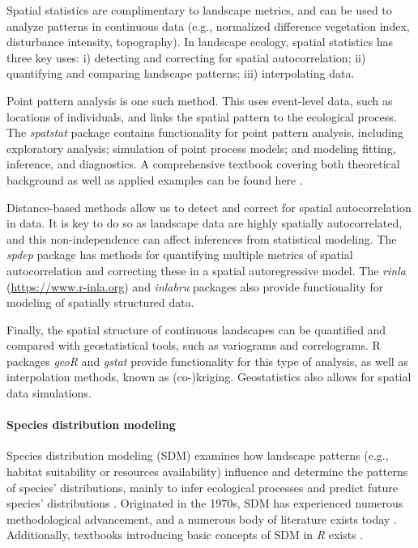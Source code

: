 \documentclass[smallextended]{svjour3}       %
\begin{document}
Spatial statistics are complimentary to landscape metrics, and can be used to analyze patterns in continuous data (e.g., normalized difference vegetation index, disturbance intensity, topography).
In landscape ecology, spatial statistics has three key uses: i) detecting and correcting for spatial autocorrelation; ii) quantifying and comparing landscape patterns; iii) interpolating data.

Point pattern analysis is one such method.
This uses event-level data, such as locations of individuals, and links the spatial pattern to the ecological process.
The \emph{spatstat} package \cite{R-spatstat} contains functionality for point pattern analysis, including exploratory analysis; simulation of point process models; and modeling fitting, inference, and diagnostics.
A comprehensive textbook covering both theoretical background as well as applied examples can be found here \cite{Baddeley2015}.

Distance-based methods allow us to detect and correct for spatial autocorrelation in data.
It is key to do so as landscape data are highly spatially autocorrelated, and this non-independence can affect inferences from statistical modeling.
The \emph{spdep} package \cite{Bivand2013} has methods for quantifying multiple metrics of spatial autocorrelation and correcting these in a spatial autoregressive model.
The \emph{rinla} \cite{rue2009approximate} (\url{https://www.r-inla.org}) and \emph{inlabru} \cite{R-inlabru} packages also provide functionality for modeling of spatially structured data.

Finally, the spatial structure of continuous landscapes can be quantified and compared with geostatistical tools, such as variograms and correlograms.
R packages \emph{geoR} \cite{R-geoR} and \emph{gstat} \cite{R-gstat} provide functionality for this type of analysis, as well as interpolation methods, known as (co-)kriging.
Geostatistics also allows for spatial data simulations.

\hypertarget{sec:SDM}{%
\paragraph{Species distribution modeling}\label{sec:SDM}}

Species distribution modeling (SDM) examines how landscape patterns (e.g., habitat suitability or resources availability) influence and determine the patterns of species' distributions, mainly to infer ecological processes and predict future species' distributions \cite{Wiersma2011}.
Originated in the 1970s, SDM has experienced numerous methodological advancement, and a numerous body of literature exists today \cite{Zimmermann2010,Norberg2019}.
Additionally, textbooks introducing basic concepts of SDM in \emph{R} exists \cite{Guisan2017,Fletcher2019}.
\end{document}
